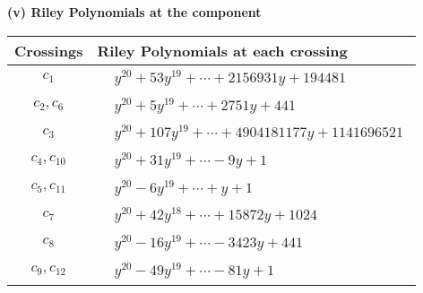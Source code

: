 \documentclass[1p]{elsarticle_modified}
\theoremstyle{definition}
\begin{document}
\newpage\renewcommand{\arraystretch}{1}
\flushleft \textbf{(v) Riley Polynomials at the component}\newline \\
\begin{tabular}{m{50pt}|m{274pt}}
Crossings & \hspace{64pt}Riley Polynomials at each crossing \\
\hline $$\begin{aligned}c_{1}\end{aligned}$$&$\begin{aligned}
&y^{20}+53 y^{19}+\cdots+2156931 y+194481
\end{aligned}$\\
\hline $$\begin{aligned}c_{2},c_{6}\end{aligned}$$&$\begin{aligned}
&y^{20}+5 y^{19}+\cdots+2751 y+441
\end{aligned}$\\
\hline $$\begin{aligned}c_{3}\end{aligned}$$&$\begin{aligned}
&y^{20}+107 y^{19}+\cdots+4904181177 y+1141696521
\end{aligned}$\\
\hline $$\begin{aligned}c_{4},c_{10}\end{aligned}$$&$\begin{aligned}
&y^{20}+31 y^{19}+\cdots-9 y+1
\end{aligned}$\\
\hline $$\begin{aligned}c_{5},c_{11}\end{aligned}$$&$\begin{aligned}
&y^{20}-6 y^{19}+\cdots+y+1
\end{aligned}$\\
\hline $$\begin{aligned}c_{7}\end{aligned}$$&$\begin{aligned}
&y^{20}+42 y^{18}+\cdots+15872 y+1024
\end{aligned}$\\
\hline $$\begin{aligned}c_{8}\end{aligned}$$&$\begin{aligned}
&y^{20}-16 y^{19}+\cdots-3423 y+441
\end{aligned}$\\
\hline $$\begin{aligned}c_{9},c_{12}\end{aligned}$$&$\begin{aligned}
&y^{20}-49 y^{19}+\cdots-81 y+1
\end{aligned}$\\
\hline
\end{tabular}\\~\\
\end{document}
